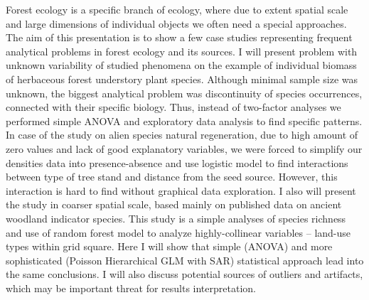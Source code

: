 \documentclass[\main/boa.tex]{subfiles}
\begin{document}
Forest ecology is a specific branch of ecology, where due to extent
spatial scale and large dimensions of individual objects we often need a
special approaches. The aim of this presentation is to show a few case
studies representing frequent analytical problems in forest ecology and
its sources. I will present problem with unknown variability of studied
phenomena on the example of individual biomass of herbaceous forest
understory plant species. Although minimal sample size was unknown, the
biggest analytical problem was discontinuity of species occurrences,
connected with their specific biology. Thus, instead of two-factor
analyses we performed simple ANOVA and exploratory data analysis to find
specific patterns. In case of the study on alien species natural
regeneration, due to high amount of zero values and lack of good
explanatory variables, we were forced to simplify our densities data
into presence-absence and use logistic model to find interactions
between type of tree stand and distance from the seed source. However,
this interaction is hard to find without graphical data exploration. I
also will present the study in coarser spatial scale, based mainly on
published data on ancient woodland indicator species. This study is a
simple analyses of species richness and use of random forest model to
analyze highly-collinear variables -- land-use types within grid square.
Here I will show that simple (ANOVA) and more sophisticated (Poisson
Hierarchical GLM with SAR) statistical approach lead into the same
conclusions. I will also discuss potential sources of outliers and
artifacts, which may be important threat for results interpretation.
\end{document}

